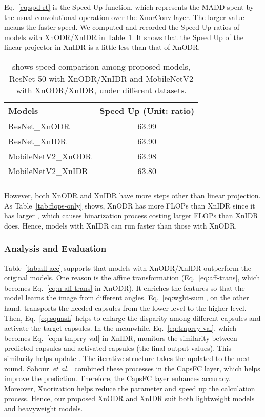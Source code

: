\documentclass[sn-mathphys,iicol,Numbered]{sn-jnl}
\newcommand{\etal}{\textit{et al.}}
\begin{document}
Eq.~\ref{eq:spd-rt} is the Speed Up function, which represents the MADD spent by the usual convolutional operation over the XnorConv layer. The larger value means the faster speed. We computed and recorded the Speed Up ratios of models with XnODR/XnIDR in Table~\ref{tab:speed-up}. It shows that the Speed Up of the linear projector in XnIDR is a little less than that of XnODR.

\begin{table}[ht]
\caption{shows speed comparison among proposed models, ResNet-50 with XnODR/XnIDR and MobileNetV2 with XnODR/XnIDR, under different datasets.}
\begin{tabular}{l|c}
\toprule
Models & Speed Up (Unit: ratio) \\
\midrule
ResNet\_XnODR & 63.99 \\
ResNet\_XnIDR & 63.90 \\
MobileNetV2\_XnODR & 63.98 \\
MobileNetV2\_XnIDR & 63.80 \\ 
\botrule
\end{tabular} \label{tab:speed-up}
\end{table}

However, both XnODR and XnIDR have more steps other than linear projection. As Table~\ref{tab:flops-only} shows, XnODR has more FLOPs than XnIDR since it has larger , which causes binarization process costing larger FLOPs than XnIDR does. Hence, models with XnIDR can run faster than those with XnODR.

\subsubsection{Analysis and Evaluation} \label{sec:4.4.4}

Table~\ref{tab:all-acc} supports that models with XnODR/XnIDR outperform the original models. One reason is the affine transformation (Eq.~\ref{eq:aff-trans}, which becomes Eq.~\ref{eq:n-aff-trans} in XnODR). It enriches the features so that the model learns the image from different angles. Eq.~\ref{eq:wght-sum}, on the other hand, transports the needed capsules from the lower level to the higher level. Then, Eq.~\ref{eq:squash} helps to enlarge the disparity among different capsules and activate the target capsules. In the meanwhile, Eq.~\ref{eq:tmprry-val}, which becomes Eq.~\ref{eq:n-tmprry-val} in XnIDR, monitors the similarity between predicted capsules and activated capsules (the final output values). This similarity helps update . The iterative structure takes the updated  to the next round. Sabour~\etal~\cite{A1_caps} combined these processes in the CapsFC layer, which helps improve the prediction. Therefore, the CapsFC layer enhances accuracy. Moreover, Xnorization helps reduce the parameter and speed up the calculation process. Hence, our proposed XnODR and XnIDR suit both lightweight models and heavyweight models.
\end{document}
